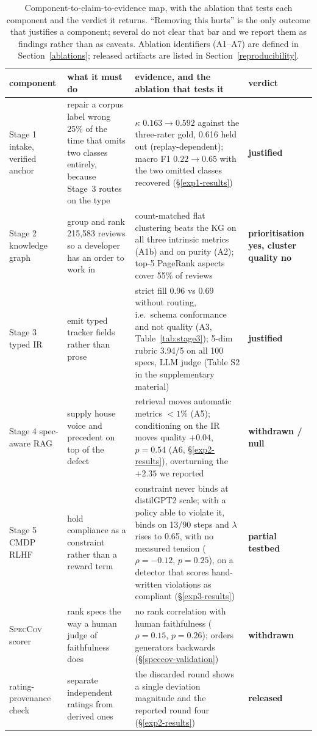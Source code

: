 \documentclass[preprint,12pt]{elsarticle}
\begin{document}
\begin{table}[!htbp]\centering\scriptsize

\begin{tabular}{@{}p{1.5cm}p{2.9cm}p{4.4cm}p{2.1cm}@{}}\toprule
component & what it must do & evidence, and the ablation that tests it & verdict \\\midrule
Stage 1 intake, verified anchor & repair a corpus label wrong 25\% of the time that omits two classes entirely, because Stage~3 routes on the type & $\kappa$ $0.163 \to 0.592$ against the three-rater gold, 0.616 held out (replay-dependent); macro F1 $0.22 \to 0.65$ with the two omitted classes recovered (\S\ref{exp1-results}) & \textbf{justified} \\
Stage 2 knowledge graph & group and rank 215{,}583 reviews so a developer has an order to work in & count-matched flat clustering beats the KG on all three intrinsic metrics (A1b) and on purity (A2); top-5 PageRank aspects cover 55\% of reviews & \textbf{prioritisation yes, cluster quality no} \\
Stage 3 typed IR & emit typed tracker fields rather than prose & strict fill 0.96 vs 0.69 without routing, i.e.\ schema conformance and not quality (A3, Table~\ref{tab:stage3}); 5-dim rubric 3.94/5 on all 100 specs, LLM judge (Table S2 in the supplementary material) & \textbf{justified} \\
Stage 4 spec-aware RAG & supply house voice and precedent on top of the defect & retrieval moves automatic metrics $<1\%$ (A5); conditioning on the IR moves quality $+0.04$, $p=0.54$ (A6, \S\ref{exp2-results}), overturning the $+2.35$ we reported & \textbf{withdrawn / null} \\
Stage 5 CMDP RLHF & hold compliance as a constraint rather than a reward term & constraint never binds at distilGPT2 scale; with a policy able to violate it, binds on 13/90 steps and $\lambda$ rises to 0.65, with no measured tension ($\rho = -0.12$, $p = 0.25$), on a detector that scores hand-written violations as compliant (\S\ref{exp3-results}) & \textbf{partial testbed} \\
\textsc{SpecCov} scorer & rank specs the way a human judge of faithfulness does & no rank correlation with human faithfulness ($\rho=0.15$, $p=0.26$); orders generators backwards (\S\ref{speccov-validation}) & \textbf{withdrawn} \\
rating-provenance check & separate independent ratings from derived ones & the discarded round shows a single deviation magnitude and the reported round four (\S\ref{exp2-results}) & \textbf{released} \\
\bottomrule\end{tabular}
\caption{Component-to-claim-to-evidence map, with the ablation that tests each component and the
verdict it returns. ``Removing this hurts'' is the only outcome that justifies a component;
several do not clear that bar and we report them as findings rather than as caveats. Ablation
identifiers (A1--A7) are defined in Section~\ref{ablations}; released artifacts are listed in
Section~\ref{reproducibility}.}\label{tab:evidence}\end{table}
\end{document}
